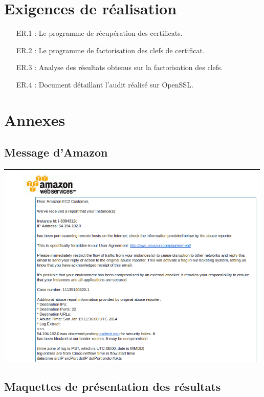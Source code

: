 \documentclass[a4paper,11pt,french]{article}
\begin{document}
\section{Exigences de réalisation}
\begin{enumerate}
	\item [ER.1] : Le programme de récupération des certificats.
	\item [ER.2] : Le programme de factorisation des clefs de certificat.
	\item [ER.3] : Analyse des résultats obtenus sur la factorisation des clefs.
	\item [ER.4] : Document détaillant l'audit réalisé sur OpenSSL.
\end{enumerate}

\section{Annexes}
\subsection{Message d'Amazon}
\begin{center}
\includegraphics[width=500px]{amazon_.png}
\end{center}

\subsection{Maquettes de présentation des résultats}
\end{document}
